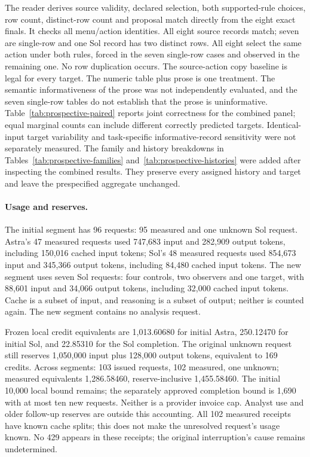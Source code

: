 The reader derives source validity, declared selection, both supported-rule
choices, row count, distinct-row count and proposal match directly from the
eight exact finals. It checks all menu/action identities. All eight source
records match; seven are single-row and one Sol record has two distinct rows.
All eight select the same action under both rules, forced in the seven
single-row cases and observed in the remaining one. No row duplication occurs.
The source-action copy baseline is legal for every target. The numeric table
plus prose is one treatment. The semantic informativeness of the prose was
not independently evaluated, and the seven single-row tables do not establish
that the prose is uninformative. Table~\ref{tab:prospective-paired} reports
joint correctness for the combined panel; equal marginal counts can include
different correctly predicted targets. Identical-input target variability
and task-specific informative-record sensitivity were not separately measured.
The family and history breakdowns in
Tables~\ref{tab:prospective-families} and~\ref{tab:prospective-histories} were
added after inspecting the combined results. They preserve every assigned
history and target and leave the prespecified aggregate unchanged.



\paragraph{Usage and reserves.}
The initial segment has 96 requests: 95 measured and one unknown Sol request.
Astra's 47 measured requests used 747,683 input and 282,909 output tokens,
including 150,016 cached input tokens; Sol's 48 measured requests used 854,673
input and 345,366 output tokens, including 84,480 cached input tokens.
The new segment uses seven Sol requests: four controls, two observers and one
target, with 88,601 input and 34,066 output tokens, including 32,000 cached
input tokens. Cache is a subset of input, and reasoning is a subset of output;
neither is counted again. The new segment contains no analysis request.

Frozen local credit equivalents are 1,013.60680 for initial Astra,
250.12470 for initial Sol, and 22.85310 for the Sol completion. The original
unknown request still reserves 1,050,000 input plus 128,000 output tokens,
equivalent to 169 credits. Across segments: 103 issued requests, 102 measured,
one unknown; measured equivalents 1,286.58460, reserve-inclusive 1,455.58460.
The initial 10,000 local bound remains; the separately approved completion
bound is 1,690 with at most ten new requests. Neither is a provider invoice
cap. Analyst use and older follow-up reserves are outside this accounting.
All 102 measured receipts have known cache splits; this does not make the
unresolved request's usage known. No 429 appears in these receipts; the
original interruption's cause remains undetermined.

